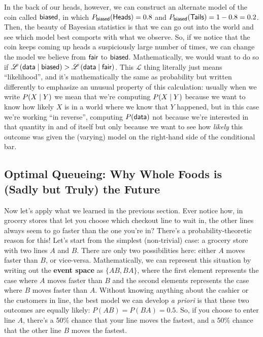 In the back of our heads, however, we can construct an alternate model of the coin called $\textsf{biased}{}$, in which $P_{\textsf{biased}}{}(\textsf{Heads}{}) = 0.8$ and $P_{\textsf{biased}}{}(\textsf{Tails}{}) = 1 - 0.8 = 0.2$. Then, the beauty of Bayesian statistics is that we can go out into the world and see which model best comports with what we observe. So, if we notice that the coin keeps coming up heads a suspiciously large number of times, we can change the model we believe from $\textsf{fair}{}$ to $\textsf{biased}{}$. Mathematically, we would want to do so if $\mathscr{L}\left(\textsf{data}{} \; | \;{} \textsf{biased}{}\right) > \mathscr{L}\left(\textsf{data}{} \; | \;{} \textsf{fair}{}\right)$. This $\mathscr{L}$ thing literally just means ``likelihood'', and it's mathematically the same as probability but written differently to emphasize an unusual property of this calculation: usually when we write $P(X \; | \;{} Y)$ we mean that we're computing $P(X \; | \;{} Y)$ because we want to know how likely $X$ is in a world where we know that $Y$ happened, but in this case we're working ``in reverse'', computing $P(\textsf{data}{})$ not because we're interested in that quantity in and of itself but only because we want to see how \textit{likely} this outcome was given the (varying) model on the right-hand side of the conditional bar.

\subsection{Optimal Queueing: Why Whole Foods is (Sadly but Truly) the Future}

Now let's apply what we learned in the previous section. Ever notice how, in grocery stores that let you choose which checkout line to wait in, the other lines always seem to go faster than the one you're in? There's a probability-theoretic reason for this! Let's start from the simplest (non-trivial) case: a grocery store with two lines $A$ and $B$. There are only two possibilities here: either $A$ moves faster than $B$, or vice-versa. Mathematically, we can represent this situation by writing out the \textbf{event space} as $\{AB, BA\}$, where the first element represents the case where $A$ moves faster than $B$ and the second elements represents the case where $B$ moves faster than $A$. Without knowing anything about the cashier or the customers in line, the best model we can develop \textit{a priori} is that these two outcomes are equally likely: $P(AB) = P(BA) = 0.5$. So, if you choose to enter line $A$, there's a 50\% chance that your line moves the fastest, and a 50\% chance that the other line $B$ moves the fastest.

